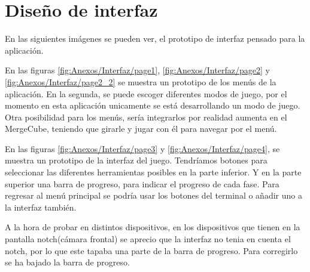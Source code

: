



\section{Diseño de interfaz}

En las siguientes imágenes se pueden ver, el prototipo de interfaz pensado para la aplicación. 

En las figuras \ref{fig:Anexos/Interfaz/page1}, \ref{fig:Anexos/Interfaz/page2} y \ref{fig:Anexos/Interfaz/page2_2} se muestra un prototipo de los menús de la aplicación. En la segunda, se puede escoger diferentes modos de juego, por el momento en esta aplicación unicamente se está desarrollando un modo de juego. 
Otra posibilidad para los menús, sería integrarlos por realidad aumenta en el MergeCube, teniendo que girarle y jugar con él para navegar por el menú.

En las figuras \ref{fig:Anexos/Interfaz/page3} y \ref{fig:Anexos/Interfaz/page4}, se muestra un prototipo de la interfaz del juego. Tendríamos botones para seleccionar las diferentes herramientas posibles en la parte inferior. Y en la parte superior una barra de progreso, para indicar el progreso de cada fase. Para regresar al menú principal se podría usar los botones del terminal o añadir uno a la interfaz también.




A la hora de probar en distintos dispositivos, en los dispositivos que tienen en la pantalla notch(cámara frontal) se aprecio que la interfaz no tenia en cuenta el notch, por lo que este tapaba una parte de la barra de progreso. Para corregirlo se ha bajado la barra de progreso.

